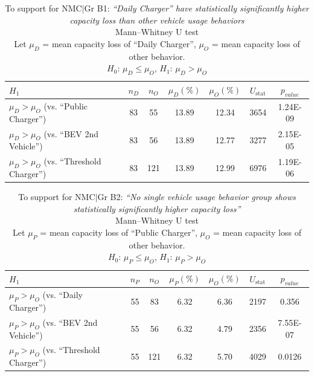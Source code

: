 \documentclass[pdflatex,sn-nature]{sn-jnl}%
\theoremstyle{thmstyleone}%
\theoremstyle{thmstyletwo}%
\theoremstyle{thmstylethree}%
\begin{document}
\begin{table}[h!]
\centering
\caption{To support for NMC$\mid$Gr B1: \textit{``Daily Charger'' have statistically significantly higher capacity loss than other vehicle usage behaviors} \\
Mann–Whitney U test \\
Let $\mu_D$ = mean capacity loss of ``Daily Charger'', $\mu_O$ = mean capacity loss of other behavior. \\
$H_0$: $\mu_D \leq \mu_O$, \quad $H_1$: $\mu_D > \mu_O$}
\renewcommand{\arraystretch}{1.3}
\begin{tabular}{lcccccc}
\toprule
\textbf{$H_1$} & $n_D$ & $n_O$ & $\mu_D (\%)$ & $\mu_O (\%)$ & $U_{\text{stat}}$ &$p_{value}$ \\
\midrule
$\mu_D > \mu_O$ (vs. ``Public Charger'') & 83 & 55 & 13.89 & 12.34 & 3654	& 1.24E-09 \\
$\mu_D > \mu_O$ (vs. ``BEV 2nd Vehicle'') & 83 & 56 & 13.89 & 12.77 & 3277 & 2.15E-05 \\
$\mu_D > \mu_O$ (vs. ``Threshold Charger'') & 83&	121	&13.89	&12.99	&6976	&1.19E-06 \\
\bottomrule
\end{tabular}
\label{tab:NMC|Grb1_daily_charger}
\end{table}



\begin{table}[h!]
\centering
\caption{To support for NMC$\mid$Gr B2: \textit{``No single vehicle usage behavior group shows statistically significantly higher capacity loss''} \\
Mann–Whitney U test \\
Let $\mu_P$ = mean capacity loss of ``Public Charger'', $\mu_O$ = mean capacity loss of other behavior. \\
$H_0$: $\mu_P \leq \mu_O$, \quad $H_1$: $\mu_P > \mu_O$}
\renewcommand{\arraystretch}{1.3}
\begin{tabular}{lcccccc}
\toprule
\textbf{$H_1$} & $n_P$ & $n_O$ & $\mu_P (\%)$ & $\mu_O (\%)$ & $U_{\text{stat}}$ & $p_{value}$ \\
\midrule
$\mu_P > \mu_O$ (vs. ``Daily Charger'') & 55 & 83 & 6.32 & 6.36 & 2197 & 0.356 \\
$\mu_P > \mu_O$ (vs. ``BEV 2nd Vehicle'') & 55 & 56 & 6.32 & 4.79 & 2356 & 7.55E-07 \\
$\mu_P > \mu_O$ (vs. ``Threshold Charger'') & 55 & 121 & 6.32 & 5.70 & 4029 & 0.0126 \\
\bottomrule
\end{tabular}
\label{tab:NMC|Grb2_public_charger}
\end{table}
\end{document}
